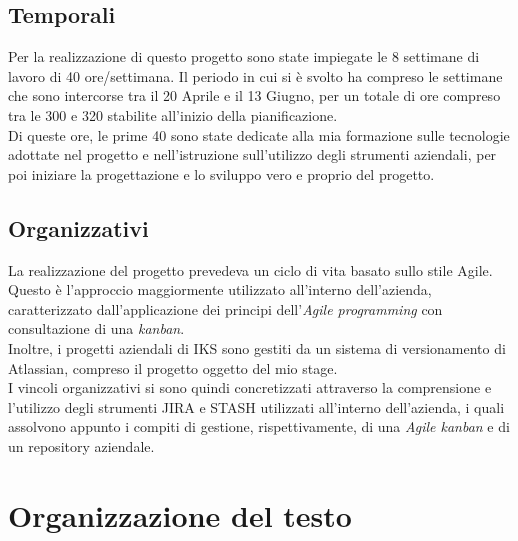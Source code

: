 \subsection{Temporali}
Per la realizzazione di questo progetto sono state impiegate le 8 settimane di lavoro di 40 ore/settimana. Il periodo in cui si è svolto ha compreso le settimane che sono intercorse tra il 20 Aprile e il 13 Giugno, per un totale di ore compreso tra le 300 e 320 stabilite all'inizio della pianificazione.\\
Di queste ore, le prime 40 sono state dedicate alla mia formazione sulle tecnologie adottate nel progetto e nell'istruzione sull'utilizzo degli strumenti aziendali, per poi iniziare la progettazione e lo sviluppo vero e proprio del progetto.

\subsection{Organizzativi}
La realizzazione del progetto prevedeva un ciclo di vita basato sullo stile Agile. Questo è l'approccio maggiormente utilizzato all'interno dell'azienda, caratterizzato dall'applicazione dei principi dell'\emph{Agile programming} con consultazione di una \emph{kanban}.\\
Inoltre, i progetti aziendali di IKS sono gestiti da un sistema di versionamento di Atlassian, compreso il progetto oggetto del mio stage.\\
I vincoli organizzativi si sono quindi concretizzati attraverso la comprensione e l'utilizzo degli strumenti JIRA e STASH utilizzati all'interno dell'azienda, i quali assolvono appunto i compiti di gestione, rispettivamente, di una \emph{Agile kanban} e di un repository aziendale.



\section{Organizzazione del testo}

%    
%    
%    
%    
%    

